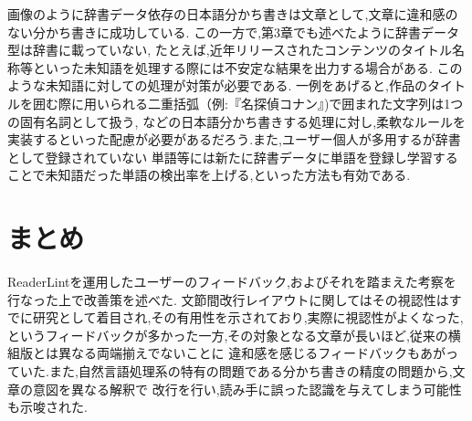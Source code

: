 
画像のように辞書データ依存の日本語分かち書きは文章として,文章に違和感のない分かち書きに成功している.
この一方で,第3章でも述べたように辞書データ型は辞書に載っていない,
たとえば,近年リリースされたコンテンツのタイトル名称等といった未知語を処理する際には不安定な結果を出力する場合がある.
このような未知語に対しての処理が対策が必要である.
一例をあげると,作品のタイトルを囲む際に用いられる二重括弧（例:『名探偵コナン』)で囲まれた文字列は1つの固有名詞として扱う,
などの日本語分かち書きする処理に対し,柔軟なルールを実装するといった配慮が必要があるだろう.また,ユーザー個人が多用するが辞書として登録されていない
単語等には新たに辞書データに単語を登録し学習することで未知語だった単語の検出率を上げる,といった方法も有効である.

\section{まとめ}
ReaderLintを運用したユーザーのフィードバック,およびそれを踏まえた考察を行なった上で改善策を述べた.
文節間改行レイアウトに関してはその視認性はすでに研究として着目され,その有用性を示されており,実際に視認性がよくなった,
というフィードバックが多かった一方,その対象となる文章が長いほど,従来の横組版とは異なる両端揃えでないことに
違和感を感じるフィードバックもあがっていた.また,自然言語処理系の特有の問題である分かち書きの精度の問題から,文章の意図を異なる解釈で
改行を行い,読み手に誤った認識を与えてしまう可能性も示唆された.